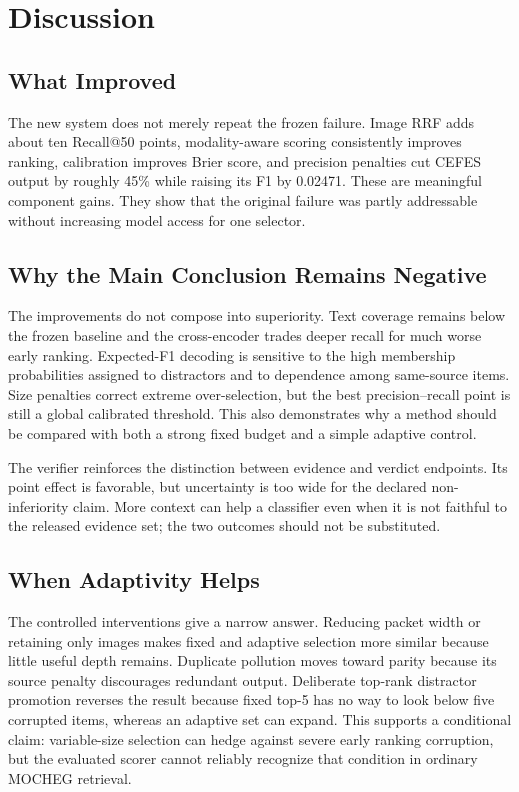 \section{Discussion}

\subsection{What Improved}

The new system does not merely repeat the frozen failure. Image RRF adds about ten Recall@50 points, modality-aware scoring consistently improves ranking, calibration improves Brier score, and precision penalties cut CEFES output by roughly 45\% while raising its F1 by 0.02471. These are meaningful component gains. They show that the original failure was partly addressable without increasing model access for one selector.

\subsection{Why the Main Conclusion Remains Negative}

The improvements do not compose into superiority. Text coverage remains below the frozen baseline and the cross-encoder trades deeper recall for much worse early ranking. Expected-F1 decoding is sensitive to the high membership probabilities assigned to distractors and to dependence among same-source items. Size penalties correct extreme over-selection, but the best precision--recall point is still a global calibrated threshold. This also demonstrates why a method should be compared with both a strong fixed budget and a simple adaptive control.

The verifier reinforces the distinction between evidence and verdict endpoints. Its point effect is favorable, but uncertainty is too wide for the declared non-inferiority claim. More context can help a classifier even when it is not faithful to the released evidence set; the two outcomes should not be substituted.

\subsection{When Adaptivity Helps}

The controlled interventions give a narrow answer. Reducing packet width or retaining only images makes fixed and adaptive selection more similar because little useful depth remains. Duplicate pollution moves \method{} toward parity because its source penalty discourages redundant output. Deliberate top-rank distractor promotion reverses the result because fixed top-5 has no way to look below five corrupted items, whereas an adaptive set can expand. This supports a conditional claim: variable-size selection can hedge against severe early ranking corruption, but the evaluated scorer cannot reliably recognize that condition in ordinary MOCHEG retrieval.

